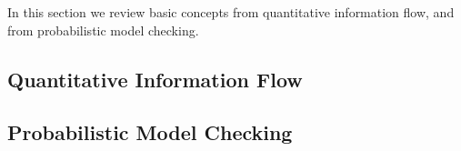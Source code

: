 In this section we review basic concepts from quantitative information flow,
and from probabilistic model checking.

\subsection{Quantitative Information Flow}
\label{sec:prelqif} 


\subsection{Probabilistic Model Checking}
\label{sec:prelprob}
